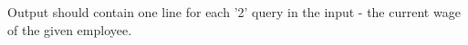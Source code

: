 Output should contain one line for each '2' query in the input - the current wage of the given employee.